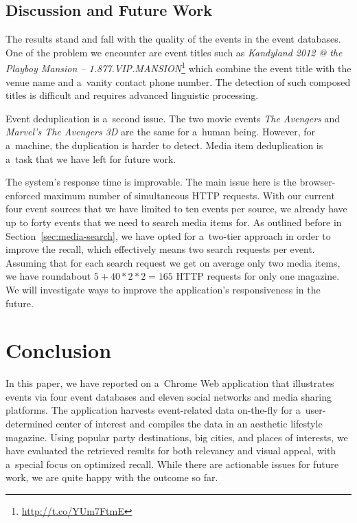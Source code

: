 \documentclass[runningheads,a4paper]{llncs}
\begin{document}
{\subsection{Discussion and Future Work}
The results stand and fall with the quality of the events in the event databases. One of the problem we encounter are event titles such as
\emph{Kandyland 2012 @ the Playboy Mansion -- 1.877.VIP.MANSION}\footnote{\url{http://t.co/YUm7FtmE}} which combine the event title with the venue name
and a~vanity contact phone number. The detection of such composed titles is difficult and requires advanced linguistic processing.

Event deduplication is a~second issue. The two movie events \emph{The Avengers} and \emph{Marvel's The Avengers 3D} are the same for a~human being. However, for a~machine, the duplication is harder to detect. Media item deduplication is a~task that we have left for future work.

The system's response time is improvable. The main issue here is the browser-enforced maximum number of simultaneous HTTP requests. With our current four event sources that we have limited to ten events per source, we already have up to forty events that we need to search media items for. As outlined before in Section~\ref{sec:media-search}, we have opted for a~two-tier approach in order to improve the recall, which effectively means two search requests per event.
Assuming that for each search request we get on average only two media items, we have roundabout $5+40*2*2=165$ HTTP requests for only one magazine. We will investigate ways to improve the application's responsiveness in the future.


\section{Conclusion}                                                        \label{sec:conclusion}
In this paper, we have reported on a~Chrome Web application that illustrates events via four event databases and eleven social networks and media sharing platforms. The application harvests event-related data on-the-fly for a~user-determined center of interest and compiles the data in an aesthetic lifestyle magazine. Using popular party destinations, big cities, and places of interests, we have evaluated the retrieved results for both relevancy and visual appeal, with a~special focus on optimized recall. While there are actionable issues for future work, we are quite happy with the outcome so far.

}
\end{document}
